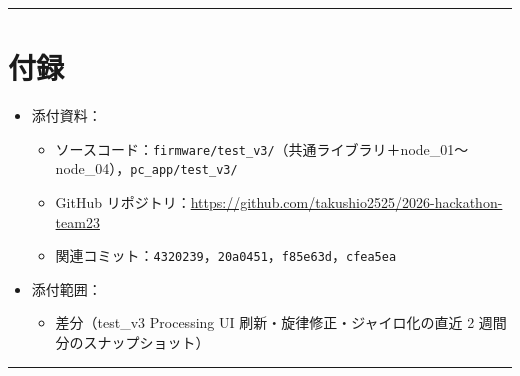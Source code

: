 \documentclass[uplatex,dvipdfmx,a4paper,11pt]{jsarticle}
\newcommand{\sectionrule}{\par\medskip\noindent\rule{\linewidth}{0.6pt}\par\medskip}
\begin{document}
\sectionrule

\section{付録}

\begin{itemize}
  \item 添付資料：
    \begin{itemize}
      \item ソースコード：\texttt{firmware/test\_v3/}（共通ライブラリ＋node\_01〜node\_04），\texttt{pc\_app/test\_v3/}
      \item GitHub リポジトリ：\url{https://github.com/takushio2525/2026-hackathon-team23}
      \item 関連コミット：\texttt{4320239}，\texttt{20a0451}，\texttt{f85e63d}，\texttt{cfea5ea}
    \end{itemize}
  \item 添付範囲：
    \begin{itemize}
      \item 差分（test\_v3 Processing UI 刷新・旋律修正・ジャイロ化の直近 2 週間分のスナップショット）
    \end{itemize}
\end{itemize}

\sectionrule
\end{document}
